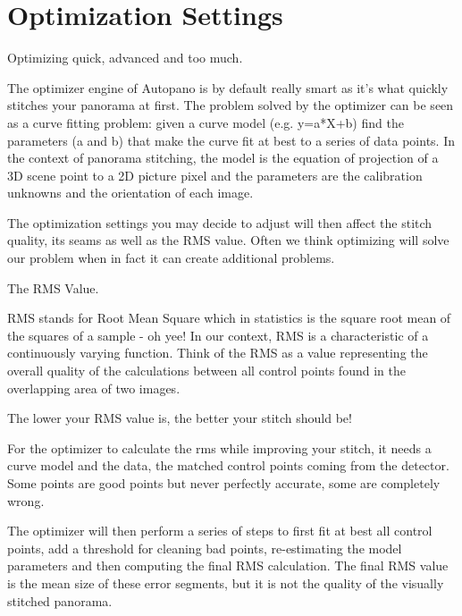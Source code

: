 \chapter{Optimization Settings}
\pagecolor{white}
\label{chap:35}
\begin{fullwidth}

\problem

{\large Optimizing quick, advanced and too much. \par}

The optimizer engine of Autopano is by default really smart as it’s what quickly stitches your panorama at first. The problem solved by the optimizer can be seen as a curve fitting problem: given a curve model (e.g. y=a*X+b) find the parameters (a and b) that make the curve fit at best to a series of data points. In the context of panorama stitching, the model is the equation of projection of a 3D scene point to a 2D picture pixel and the parameters are the calibration unknowns and the orientation of each image.

The optimization settings you may decide to adjust will then affect the stitch quality, its seams as well as the RMS value. Often we think optimizing will solve our problem when in fact it can create additional problems.

\solution

{\large The RMS Value. \par}

RMS stands for Root Mean Square which in statistics is the square root mean of the squares of a sample - oh yee! In our context, RMS is a characteristic of a continuously varying function. Think of the RMS as a value representing the overall quality of the calculations between all control points found in the overlapping area of two images.

The lower your RMS value is, the better your stitch should be!


For the optimizer to calculate the rms while improving your stitch, it needs a curve model and the data, the matched control points coming from the detector. Some points are good points but never perfectly accurate, some are completely wrong. 

The optimizer will then perform a series of steps to first fit at best all control points, add a threshold for cleaning bad points, re-estimating the model parameters and then computing the final RMS calculation. The final RMS value is the mean size of these error segments, but it is not the quality of the visually stitched panorama.


\end{fullwidth}
